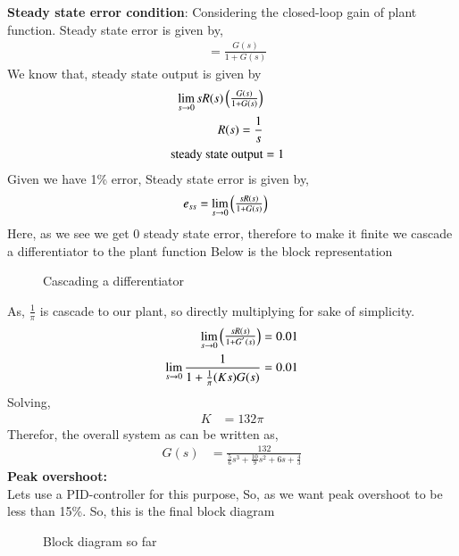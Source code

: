 \begin{enumerate}[label=\thesection.\arabic*.,ref=\thesection.\theenumi]
\textbf{Steady state error condition}:\newline
Considering the closed-loop gain of plant function.\newline
Steady state error is given by,\newline
\begin{align}
    &= \frac{G(s)}{1 + G(s)}
\end{align}
We know that, steady state output is given by 
\begin{align}
    \lim_{s\to0} sR(s)\begin{pmatrix}\frac{G(s)}{1 + G(s)}\end{pmatrix}\\
    R(s) = \frac{1}{s}\\
   \text{ steady state output} &= 1
\end{align}
Given we have 1\% error,\newline
Steady state error is given by,\newline
\begin{align}
    e_{ss} &= \lim_{s\to0} \begin{pmatrix}\frac{sR(s)}{1 + G(s)}\end{pmatrix}
\end{align}   
Here, as we see we get 0 steady state error, therefore to make it finite we cascade a differentiator to the plant function\newline
Below is the block representation\newline
\begin{figure}[!ht]
    \begin{center}
			\resizebox{\columnwidth}{!}{}
	\end{center}
\caption{Cascading a differentiator}
\label{fig:block2}
\end{figure}\newline
As, $\frac{1}{\pi}$ is cascade to our plant, so directly multiplying for sake of simplicity.
\begin{align}
    \lim_{s\to0} \begin{pmatrix}\frac{sR(s)}{1 + G^{'}(s)}\end{pmatrix} &= 0.01\\
    \lim_{s\to0} \frac{1}{1 + \frac{1}{\pi}(Ks)G(s)} &= 0.01
\end{align} 
Solving, \\
\begin{align}
    K &= 132\pi
\end{align}
Therefor, the overall system as can be written as,\newline
\begin{align}
    G(s) &= \frac{132}{\frac{5}{6}s^3 + \frac{10}{9}s^2 + 6s + \frac{4}{3}}
\end{align}
\textbf{Peak overshoot:}\\
Lets use a PID-controller for this purpose, 
So, as we want peak overshoot to be less than 15\%.\newline
So, this is the final block diagram\newline\newline
\begin{figure}[!ht]
    \begin{center}
			\resizebox{\columnwidth}{!}{}
	\end{center}
\caption{Block diagram so far}
\label{fig:block3}
\end{figure}


\end{enumerate}
